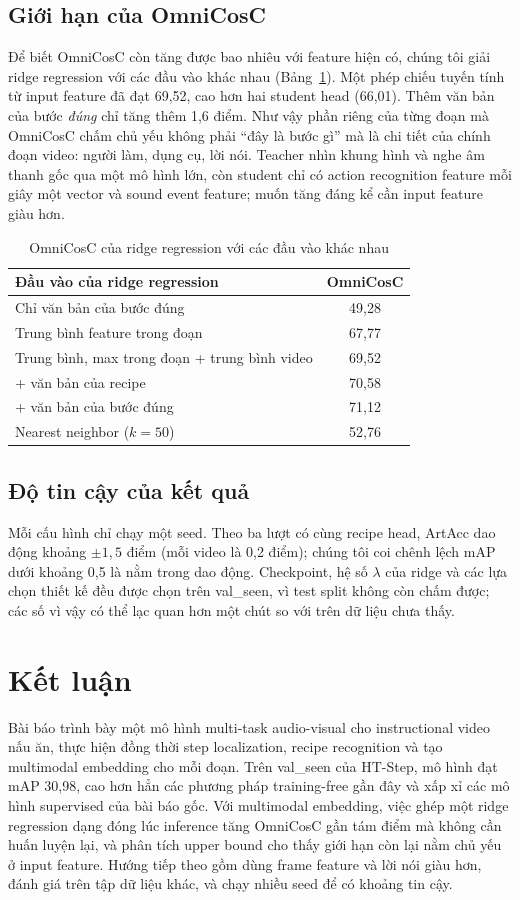 \documentclass{IEEEtran}
\begin{document}
\subsection{Giới hạn của OmniCosC}
Để biết OmniCosC còn tăng được bao nhiêu với feature hiện có, chúng tôi giải ridge regression với các đầu vào khác nhau (Bảng~\ref{tab:ceiling}). Một phép chiếu tuyến tính từ input feature đã đạt 69,52, cao hơn hai student head (66,01). Thêm văn bản của bước \emph{đúng} chỉ tăng thêm 1,6 điểm. Như vậy phần riêng của từng đoạn mà OmniCosC chấm chủ yếu không phải ``đây là bước gì'' mà là chi tiết của chính đoạn video: người làm, dụng cụ, lời nói. Teacher nhìn khung hình và nghe âm thanh gốc qua một mô hình lớn, còn student chỉ có action recognition feature mỗi giây một vector và sound event feature; muốn tăng đáng kể cần input feature giàu hơn.

\begin{table}[t]
\caption{OmniCosC của ridge regression với các đầu vào khác nhau}
\label{tab:ceiling}
\centering
\begin{tabular}{|l|c|}
\hline
Đầu vào của ridge regression & OmniCosC \\
\hline
Chỉ văn bản của bước đúng & 49,28 \\
Trung bình feature trong đoạn & 67,77 \\
Trung bình, max trong đoạn + trung bình video & 69,52 \\
\quad + văn bản của recipe & 70,58 \\
\quad + văn bản của bước đúng & 71,12 \\
\hline
Nearest neighbor ($k = 50$) & 52,76 \\
\hline
\end{tabular}
\end{table}

\subsection{Độ tin cậy của kết quả}
Mỗi cấu hình chỉ chạy một seed. Theo ba lượt có cùng recipe head, ArtAcc dao động khoảng $\pm 1{,}5$ điểm (mỗi video là 0,2 điểm); chúng tôi coi chênh lệch mAP dưới khoảng 0,5 là nằm trong dao động. Checkpoint, hệ số $\lambda$ của ridge và các lựa chọn thiết kế đều được chọn trên val\_seen, vì test split không còn chấm được; các số vì vậy có thể lạc quan hơn một chút so với trên dữ liệu chưa thấy.

\section{Kết luận}
Bài báo trình bày một mô hình multi-task audio-visual cho instructional video nấu ăn, thực hiện đồng thời step localization, recipe recognition và tạo multimodal embedding cho mỗi đoạn. Trên val\_seen của HT-Step, mô hình đạt mAP 30,98, cao hơn hẳn các phương pháp training-free gần đây và xấp xỉ các mô hình supervised của bài báo gốc. Với multimodal embedding, việc ghép một ridge regression dạng đóng lúc inference tăng OmniCosC gần tám điểm mà không cần huấn luyện lại, và phân tích upper bound cho thấy giới hạn còn lại nằm chủ yếu ở input feature. Hướng tiếp theo gồm dùng frame feature và lời nói giàu hơn, đánh giá trên tập dữ liệu khác, và chạy nhiều seed để có khoảng tin cậy.
\end{document}
